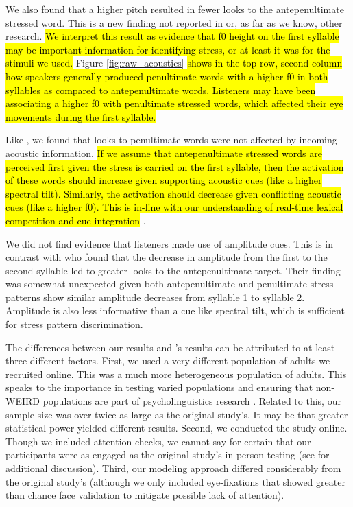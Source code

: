 We also found that a higher pitch resulted in fewer looks to the antepenultimate stressed word. This is a new finding not reported in \cite{Sulpizio_McQueen_2012} or, as far as we know, other research. \hl{We interpret this result as evidence that f0 height on the first syllable may be important information for identifying stress, or at least it was for the stimuli we used.} Figure \ref{fig:raw_acoustics} \hl{shows in the top row, second column how speakers generally produced penultimate words with a higher f0 in both syllables as compared to antepenultimate words. Listeners may have been associating a higher f0 with penultimate stressed words, which affected their eye movements during the first syllable.}

Like \cite{Sulpizio_McQueen_2012}, we found that looks to penultimate words were not affected by incoming acoustic information. \hl{If we assume that antepenultimate stressed words are perceived first given the stress is carried on the first syllable, then the activation of these words should increase given supporting acoustic cues (like a higher spectral tilt). Similarly, the activation should decrease given conflicting acoustic cues (like a higher f0). This is in-line with our understanding of real-time lexical competition and cue integration} \citep{Marslen1980, Kong2016, mcmurray_2008}.

We did not find evidence that listeners made use of amplitude cues. This is in contrast with \cite{Sulpizio_McQueen_2012} who found that the decrease in amplitude from the first to the second syllable led to greater looks to the antepenultimate target. Their finding was somewhat unexpected given both antepenultimate and penultimate stress patterns show similar amplitude decreases from syllable 1 to syllable 2. Amplitude is also less informative than a cue like spectral tilt, which is sufficient for stress pattern discrimination.  

The differences between our results and \cite{Sulpizio_McQueen_2012}'s results can be attributed to at least three different factors. First, we used a very different population of adults we recruited online. This was a much more heterogeneous population of adults. This speaks to the importance in testing varied populations and ensuring that non-WEIRD populations are part of psycholinguistics research \citep{frost2021investigating}. Related to this, our sample size was over twice as large as the original study's. It may be that greater statistical power yielded different results. Second, we conducted the study online. Though we included attention checks, we cannot say for certain that our participants were as engaged as the original study's in-person testing (see \cite{rodd2024moving} for additional discussion). Third, our modeling approach differed considerably from the original study's (although we only included eye-fixations that showed greater than chance face validation to mitigate possible lack of attention).


